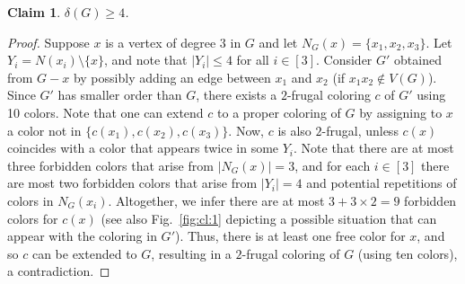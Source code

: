 \documentclass[10pt,a4paper]{article}
\newtheorem{claim}{Claim}
\begin{document}

\begin{claim} $\delta(G)\ge 4$.
\label{cl:1}
\end{claim} 
\begin{proof}
Suppose $x$ is a vertex of degree $3$ in $G$ and let $N_G(x)=\{x_1,x_2,x_3\}$. Let $Y_i=N(x_i)\setminus\{x\}$, and note that $|Y_i|\le 4$ for all $i\in [3]$. Consider $G'$ obtained from $G-x$ by possibly adding an edge between $x_1$ and $x_2$ (if $x_1x_2\notin V(G)$). Since $G'$ has smaller order than $G$, there exists a $2$-frugal coloring $c$ of $G'$ using 10 colors. Note that one can extend $c$ to a proper coloring of $G$ by assigning to $x$ a color not in $\{c(x_1),c(x_2),c(x_3)\}$. Now, $c$ is also $2$-frugal, unless $c(x)$ coincides with a color that appears twice in some $Y_i$. Note that there are at most three forbidden colors that arise from $|N_G(x)|=3$, and for each $i\in [3]$ there are most two forbidden colors that arise from $|Y_i|=4$ and potential repetitions of colors in $N_G(x_i)$. Altogether, we infer there are at most $3+3\times 2=9$ forbidden colors for $c(x)$ (see also Fig.~\ref{fig:cl:1} depicting a possible situation that can appear with the coloring in $G'$). Thus, there is at least one free color for $x$, and so $c$ can be extended to $G$, resulting in a $2$-frugal coloring of $G$ (using ten colors), a contradiction.
\end{proof}
\end{document}
